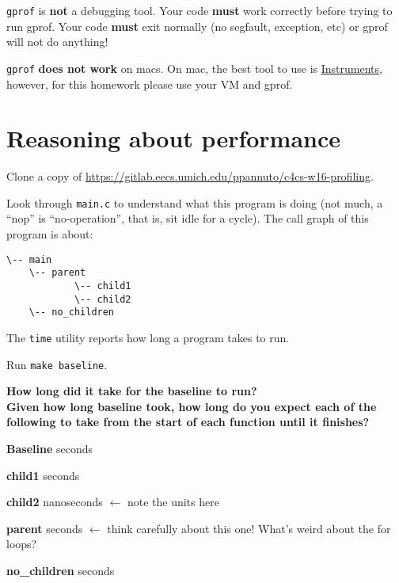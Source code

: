 \documentclass{article}
\begin{document}
\texttt{gprof} is \textbf{not} a debugging tool. Your code \textbf{must} work
correctly before trying to run gprof. Your code \textbf{must} exit normally
(no segfault, exception, etc) or gprof will not do anything!

\texttt{gprof} \textbf{does not work} on macs. On mac, the best tool to use is
\href{https://developer.apple.com/library/watchos/documentation/DeveloperTools/Conceptual/InstrumentsUserGuide/index.html}{Instruments},
however, for this homework please use your VM and gprof.


\newpage
\section{Reasoning about performance}

Clone a copy of
\url{https://gitlab.eecs.umich.edu/ppannuto/c4cs-w16-profiling}.

Look through \texttt{main.c} to understand what this program is doing (not
much, a ``nop'' is ``no-operation'', that is, sit idle for a cycle). The call
graph of this program is about:
\begin{verbatim}
\-- main
    \-- parent
            \-- child1
            \-- child2
    \-- no_children
\end{verbatim}

The \texttt{time} utility reports how long a program takes to run.

Run \texttt{make~baseline}.

\textbf{How long did it take for the baseline to run?\\
  Given how long baseline took, how long do you expect each of the following
  to take from the start of each function until it finishes?}

\bigskip
\textbf{Baseline} \underline{\hspace{3cm}} seconds

\bigskip
\textbf{child1} \underline{\hspace{3cm}} seconds

\bigskip
\textbf{child2} \underline{\hspace{3cm}} nanoseconds $\leftarrow$ note the units here

\bigskip
\textbf{parent} \underline{\hspace{3cm}} seconds $\leftarrow$ think carefully about this one! What's weird about the for loops?

\bigskip
\textbf{no\_children} \underline{\hspace{3cm}} seconds
\end{document}
